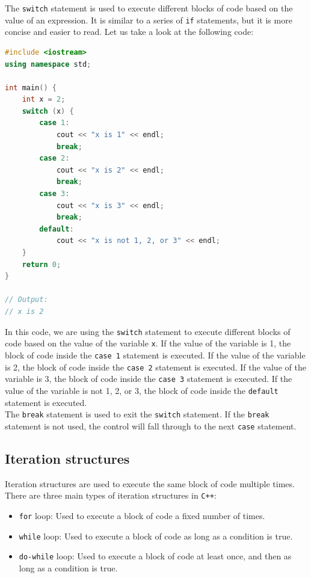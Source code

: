 The \texttt{switch} statement is used to execute different blocks of code based on the value of an expression. It
is similar to a series of \texttt{if} statements, but it is more concise and easier to read. Let us take a look at the
following code:

\begin{lstlisting}[language=C++]
#include <iostream>
using namespace std;

int main() {
    int x = 2;
    switch (x) {
        case 1:
            cout << "x is 1" << endl;
            break;
        case 2:
            cout << "x is 2" << endl;
            break;
        case 3:
            cout << "x is 3" << endl;
            break;
        default:
            cout << "x is not 1, 2, or 3" << endl;
    }
    return 0;
}

// Output:
// x is 2
\end{lstlisting}

In this code, we are using the \texttt{switch} statement to execute different blocks of code based on the value of the
variable \texttt{x}. If the value of the variable is 1, the block of code inside the \texttt{case 1} statement is executed.
If the value of the variable is 2, the block of code inside the \texttt{case 2} statement is executed. If the value of the
variable is 3, the block of code inside the \texttt{case 3} statement is executed. If the value of the variable is not 1,
2, or 3, the block of code inside the \texttt{default} statement is executed.\\

The \texttt{break} statement is used to exit the \texttt{switch} statement. If the \texttt{break} statement is not used,
the control will fall through to the next \texttt{case} statement.\\

\subsection{Iteration structures}

Iteration structures are used to execute the same block of code multiple times. There are three main types of iteration
structures in \texttt{C++}:

\begin{itemize}
    \item \texttt{for} loop: Used to execute a block of code a fixed number of times.
    \item \texttt{while} loop: Used to execute a block of code as long as a condition is true.
    \item \texttt{do-while} loop: Used to execute a block of code at least once, and then as long as a condition is true.
\end{itemize}

